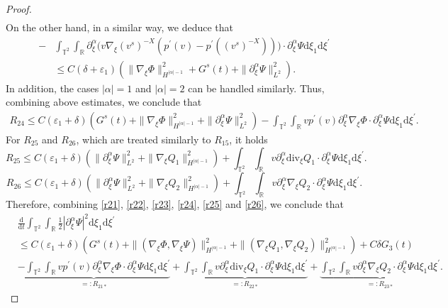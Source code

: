 \documentclass[10pt,reqno]{amsart}
\numberwithin{equation}{section}
\newcommand{\dif}{\mathrm{d}}
\newcommand{\ddiv}{\mathrm{div}}
\begin{document}
\begin{proof}
\begin{align*}
\end{align*}
On the other hand, in a similar way, we deduce that
\begin{align*}
-&\int_{\mathbb{T}^2}\int_{\mathbb{R}}\partial_\xi^\alpha\Big(v\nabla_\xi(v^s)^{-X}\left(p^\prime(v)-p^\prime((v^s)^{-X})\right)\Big)\cdot\partial_\xi^\alpha\Psi\dif \xi_1\dif \xi^{\prime}\\
&\le C(\delta+\varepsilon_1)(\|\nabla_\xi\Phi\|_{H^{|\alpha|-1}}^2+G^s(t)+\|\partial_\xi^\alpha\Psi\|_{L^2}^2).
\end{align*}
In addition, the cases $|\alpha|=1$ and $|\alpha|=2$ can be handled similarly. Thus, combining above estimates, we conclude that
\begin{equation}\label{r24}
\begin{aligned}
R_{24}\le C(\varepsilon_1+\delta)\left(G^s(t)+\|\nabla_\xi\Phi\|_{H^{|\alpha|-1}}^2+\|\partial_\xi^\alpha\Psi\|_{L^2}^2\right)
-\int_{\mathbb{T}^2}\int_{\mathbb{R}}
vp^\prime(v)\partial_\xi^\alpha\nabla_\xi\Phi
\cdot\partial_\xi^\alpha\Psi\dif \xi_1\dif \xi^{\prime}.
\end{aligned}
\end{equation}
For $R_{25}$ and $R_{26}$, which are treated similarly to $R_{15}$, it holds
\begin{equation}\label{r25}
R_{25}\le
C(\varepsilon_1+\delta)\left(
\|\partial_\xi^\alpha\Psi\|^2_{L^2}
+
\|\nabla_\xi Q_1\|_{H^{|\alpha|-1}}^2\right)
+\int_{\mathbb{T}^2}\int_{\mathbb{R}}v\partial_\xi^\alpha\ddiv_\xi Q_1\cdot\partial_\xi^\alpha\Psi\dif \xi_1\dif \xi^{\prime}.
\end{equation}
\begin{equation}\label{r26}
R_{26}\le
C(\varepsilon_1+\delta)\left(
\|\partial_\xi^\alpha\Psi\|^2_{L^2}
+
\|\nabla_\xi Q_2\|_{H^{|\alpha|-1}}^2\right)
+\int_{\mathbb{T}^2}\int_{\mathbb{R}}v\partial_\xi^\alpha\nabla_\xi Q_2\cdot\partial_\xi^\alpha\Psi\dif \xi_1\dif \xi^{\prime}.
\end{equation}
Therefore, combining \eqref{r21}, \eqref{r22}, \eqref{r23}, \eqref{r24}, \eqref{r25} and \eqref{r26}, we conclude that
\begin{equation}\label{hg1.2}
\begin{aligned}
&\frac{\dif}{\dif t}\int_{\mathbb{T}^2}\int_{\mathbb{R}}
\frac{1}{2}|\partial_\xi^\alpha\Psi|^2\dif \xi_1\dif \xi^{\prime}\\
&\le C(\varepsilon_1+\delta)\left(G^s(t)+\|(\nabla_\xi\Phi, \nabla_\xi\Psi) \|_{H^{|\alpha|-1}}^2+\|(\nabla_\xi Q_1, \nabla_\xi Q_2) \|_{H^{|\alpha|-1}}^2\right)
+C\delta G_3(t)
\\&\underbrace{-\int_{\mathbb{T}^2}\int_{\mathbb{R}}vp^\prime(v)\partial_\xi^\alpha\nabla_\xi\Phi\cdot\partial_\xi^\alpha\Psi
\dif \xi_1\dif \xi^{\prime}}\limits_{=:R_{21\ast}}
+\underbrace{\int_{\mathbb{T}^2}\int_{\mathbb{R}}v\partial_\xi^\alpha\ddiv_\xi Q_1\cdot\partial_\xi^\alpha\Psi\dif \xi_1\dif \xi^{\prime}}\limits_{=:R_{22\ast}}
+\underbrace{\int_{\mathbb{T}^2}\int_{\mathbb{R}}v\partial_\xi^\alpha\nabla_\xi Q_2\cdot\partial_\xi^\alpha\Psi\dif \xi_1\dif \xi^{\prime}}\limits_{=:R_{23\ast}}.
\end{aligned}
\end{equation}


\end{proof}
\end{document}
